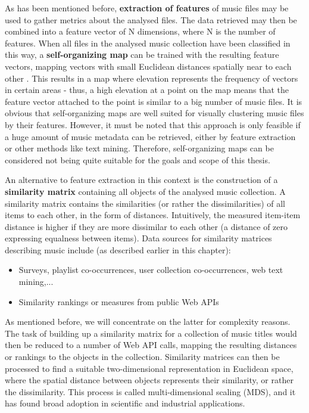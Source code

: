 As has been mentioned before, \textbf{extraction of features} of music files may be used to gather metrics
about the analysed files. The data retrieved may then be combined into a feature vector of N dimensions,
where N is the number of features. When all files in the analysed music collection have been classified in
this way, a \textbf{self-organizing map} can be trained with the resulting feature vectors, mapping 
vectors with small Euclidean distances spatially near to each other \cite{RAU_02ismir}. This results
in a map where elevation represents the frequency of vectors in certain areas - thus, a high elevation
at a point on the map means that the feature vector attached to the point is similar to a big number of music
files. It is obvious that self-organizing maps are well suited for visually clustering music files by their 
features. However, it must be noted that this approach is only feasible if a huge amount of music metadata 
can be retrieved, either by feature extraction or other methods like text mining. Therefore, self-organizing 
maps can be considered not being quite suitable for the goals and scope of this thesis.

An alternative to feature extraction in this context is the construction of a 
\textbf{similarity matrix} containing all objects of the analysed music collection. A similarity matrix contains
the similarities (or rather the dissimilarities) of all items to each other, in the form of distances.
Intuitively, the measured item-item distance is higher if they are more dissimilar to each other (a distance of
zero expressing equalness between items). Data sources for similarity matrices describing music include 
(as described earlier in this chapter):
\begin{itemize}
	\item Surveys, playlist co-occurrences, user collection co-occurrences, web text mining,... 
	\item Similarity rankings or measures from public Web APIs
\end{itemize}
As mentioned before, we will concentrate on the latter for complexity reasons. The task of building up a 
similarity matrix for a collection of music titles would then be reduced to a number of Web API calls, mapping the
resulting distances or rankings to the objects in the collection. Similarity matrices can then be processed
to find a suitable two-dimensional representation in Euclidean space, where the spatial distance between
objects represents their similarity, or rather the dissimilarity. This process is called multi-dimensional scaling (MDS), and it has found broad adoption in scientific and industrial applications. 

